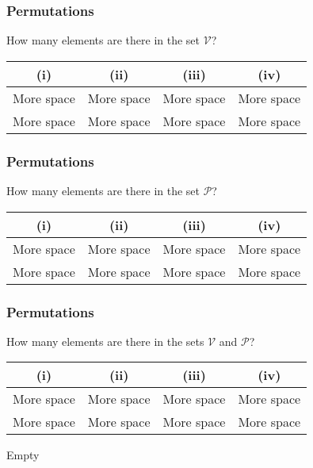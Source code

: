 \documentclass[slidemain.tex]{subfiles}
\begin{document}
\begin{frame}

\frametitle{Permutations}
\Large
How many elements are there in the set $\mathcal{V}$?
\begin{center}
\begin{tabular}{|c|c|c|c|}
\hline (i) &  (ii) &  (iii) &  (iv) \\ 
\hline {\color{white}More space} &{\color{white}More space}  & {\color{white}More space} &{\color{white}More space}  \\ 
 {\color{white}More space} &{\color{white}More space}  & {\color{white}More space} &{\color{white}More space}  \\ 
\hline 
\end{tabular} 
\end{center}
\end{frame}

\begin{frame}

\frametitle{Permutations}
\Large
How many elements are there in the set $\mathcal{P}$?
\begin{center}
\begin{tabular}{|c|c|c|c|}
\hline (i) &  (ii) &  (iii) &  (iv) \\ 
\hline {\color{white}More space} &{\color{white}More space}  & {\color{white}More space} &{\color{white}More space}  \\ 
 {\color{white}More space} &{\color{white}More space}  & {\color{white}More space} &{\color{white}More space}  \\ 
\hline 
\end{tabular} 
\end{center}
\end{frame}
\begin{frame}

\frametitle{Permutations}
\Large
How many elements are there in the sets $\mathcal{V}$ and $\mathcal{P}$?
\begin{center}
\begin{tabular}{|c|c|c|c|}
\hline (i) &  (ii) &  (iii) &  (iv) \\ 
\hline {\color{white}More space} &{\color{white}More space}  & {\color{white}More space} &{\color{white}More space}  \\ 
 {\color{white}More space} &{\color{white}More space}  & {\color{white}More space} &{\color{white}More space}  \\ 
\hline 
\end{tabular} 
\end{center}
\end{frame}
\begin{frame}
Empty
\end{frame}
\end{document}
